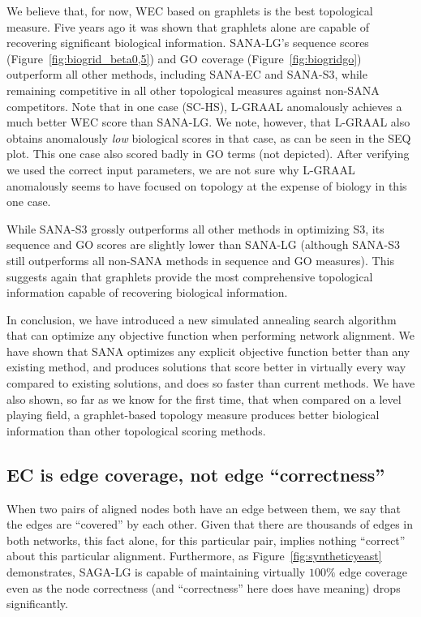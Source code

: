 \documentclass{bioinfo}
\begin{document}
We believe that, for now, WEC based on graphlets is the best topological measure. Five years ago \citep{GRAAL} it was shown that graphlets alone are capable of recovering significant biological information. SANA-LG's sequence scores (Figure~\ref{fig:biogrid_beta0,5}) and GO coverage (Figure~\ref{fig:biogridgo}) outperform all other methods, including SANA-EC and SANA-S3, while remaining competitive in all other topological measures against non-SANA competitors. Note that in one case (SC-HS), L-GRAAL anomalously achieves a much better WEC score than SANA-LG. We note, however, that L-GRAAL also obtains anomalously \textit{low} biological scores in that case, as can be seen in the SEQ plot. This one case also scored badly in GO terms (not depicted). After verifying we used the correct input parameters, we are not sure why L-GRAAL anomalously seems to have focused on topology at the expense of biology in this one case.

While SANA-S3 grossly outperforms all other methods in optimizing S3, its sequence and GO scores are slightly lower than SANA-LG (although SANA-S3 still outperforms all non-SANA methods in sequence and GO measures). This suggests again that graphlets provide the most comprehensive topological information capable of recovering biological information.

In conclusion, we have introduced a new simulated annealing search algorithm that can optimize any objective function when performing network alignment.  We have shown that SANA optimizes any explicit objective function better than any existing method, and produces solutions that score better in virtually every way compared to existing solutions, and does so faster than current methods. We have also shown, so far as we know for the first time, that when compared on a level playing field, a graphlet-based topology measure produces better biological information than other topological scoring methods.

\subsection{EC is edge coverage, not edge ``correctness''}

When two pairs of aligned nodes both have an edge between them, we say that the edges are ``covered'' by each other.  Given that there are thousands of edges in both networks, this fact alone, for this particular pair, implies nothing ``correct'' about this particular alignment.  Furthermore, as Figure~\ref{fig:syntheticyeast} demonstrates, SAGA-LG is capable of maintaining virtually $100\%$ edge coverage even as the node correctness (and ``correctness'' here does have meaning) drops significantly.
\end{document}
